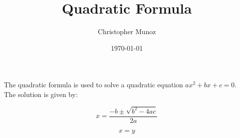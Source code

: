 \documentclass{article}
\begin{document}
\title{Quadratic Formula}
\author{Christopher Munoz}
\date{\today}

\maketitle

The quadratic formula is used to solve a quadratic equation $ax^2 + bx + c = 0$. The solution is given by:

\begin{equation}
x = \frac{-b \pm \sqrt{b^2 - 4ac}}{2a}
\end{equation}

\begin{equation}
    x = y
\end{equation}
\end{document}
